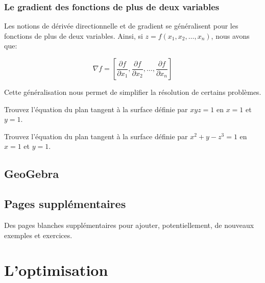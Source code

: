 \documentclass[]{book}
\theoremstyle{definition}
\theoremstyle{definition}
\theoremstyle{definition}
\theoremstyle{remark}
\let\BeginKnitrBlock\begin \let\EndKnitrBlock\end
\begin{document}
\hypertarget{le-gradient-des-fonctions-de-plus-de-deux-variables}{%
\subsection{Le gradient des fonctions de plus de deux
variables}\label{le-gradient-des-fonctions-de-plus-de-deux-variables}}

Les notions de dérivée directionnelle et de gradient se généralisent
pour les fonctions de plus de deux variables. Ainsi, si
\(z=f(x_1,x_2,\ldots, x_n)\), nous avons que:

\[ \nabla f = \left[\dfrac{\partial f}{\partial x_1},\dfrac{\partial f}{\partial x_2},\ldots,\dfrac{\partial f}{\partial x_n}\right] \]

Cette généralisation nous permet de simplifier la résolution de certains
problèmes.

\BeginKnitrBlock{example}
\protect\hypertarget{exm:unnamed-chunk-207}{}{\label{exm:unnamed-chunk-207}
}Trouvez l'équation du plan tangent à la surface définie par \(xyz=1\)
en \(x=1\) et \(y=1\).
\EndKnitrBlock{example}
\vspace*{8cm}

\BeginKnitrBlock{example}
\protect\hypertarget{exm:unnamed-chunk-208}{}{\label{exm:unnamed-chunk-208}
}Trouvez l'équation du plan tangent à la surface définie par
\(x^2+y-z^3=1\) en \(x=1\) et \(y=1\).
\EndKnitrBlock{example}
\vspace*{8cm}

\hypertarget{geogebra-derivfctvar}{%
\section{GeoGebra}\label{geogebra-derivfctvar}}

\hypertarget{applet_container}{}

\newpage

\hypertarget{pages-supplementaires-4}{%
\section{Pages supplémentaires}\label{pages-supplementaires-4}}

Des pages blanches supplémentaires pour ajouter, potentiellement, de
nouveaux exemples et exercices.


\hypertarget{optimisation}{%
\chapter{L'optimisation}\label{optimisation}}
\end{document}

